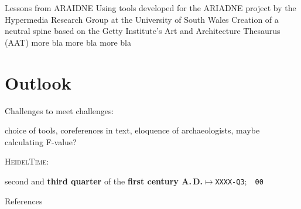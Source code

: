 \documentclass[xcolor=x11names, aspectratio=169,usenames,dvipsnames]{beamer}
\begin{document}
\begin{frame}{Lessons from ARAIDNE}
Using tools developed for the ARIADNE project by the Hypermedia Research Group at the University of South Wales \hfill{}\newline
Creation of a neutral spine based on the Getty Institute's Art and Architecture Thesaurus (AAT)\newline
more bla\newline
more bla\newline
more bla\newline
\end{frame}

\section{Outlook}

\begin{frame}{Challenges to meet}
challenges:

choice of tools, coreferences in text, eloquence of archaeologists, maybe calculating F-value?

\textsc{HeidelTime}:\vspace{-1em}
\begin{center}
second and \textbf{third quarter} of the \textbf{first century A.\,D.}\quad$\longmapsto$\quad\texttt{XXXX-Q3};~~\texttt{00}
\end{center}
\end{frame}

\begin{frame}{References}

\printbibliography[heading=none]
\end{frame}
\end{document}
